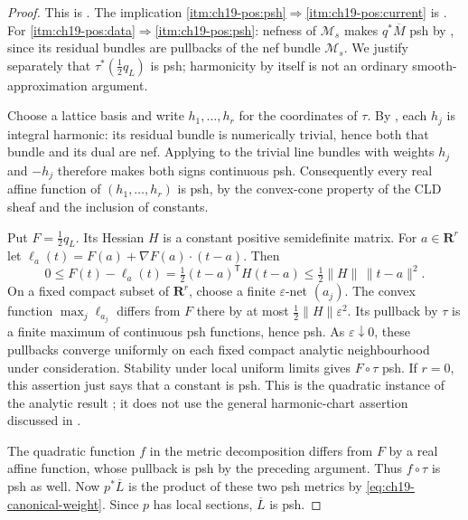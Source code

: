 \begin{proof}
This is \cite[Proposition~19.3.1, Corollary~19.3.2 and
Theorem~B.6.4]{CLD25}.  The implication
\cref{itm:ch19-pos:psh}$\Rightarrow$\cref{itm:ch19-pos:current} is
.  For
\cref{itm:ch19-pos:data}$\Rightarrow$\cref{itm:ch19-pos:psh}: nefness of
$\mathcal M_s$ makes $q^*\overline M$ psh by
, since its residual bundles are pullbacks
of the nef bundle $\mathcal M_s$.  We justify separately that
$\tau^*(\tfrac12q_L)$ is psh; harmonicity by itself is not an ordinary
smooth-approximation argument.

Choose a lattice basis and write $h_1,\ldots,h_r$ for the coordinates of
$\tau$.  By , each $h_j$ is integral harmonic:
its residual bundle is numerically trivial, hence both that bundle and its
dual are nef.  Applying  to the trivial
line bundles with weights $h_j$ and $-h_j$ therefore makes both signs
continuous psh.  Consequently every real affine
function of $(h_1,\ldots,h_r)$ is psh, by the convex-cone property of the
CLD sheaf and the inclusion of constants.

Put $F=\tfrac12q_L$.  Its Hessian $H$ is a constant positive semidefinite
matrix.  For $a\in\mathbf R^r$ let
$\ell_a(t)=F(a)+\nabla F(a)\cdot(t-a)$.  Then
\[
 0\leq F(t)-\ell_a(t)
       =\tfrac12(t-a)^{\mathsf T}H(t-a)
       \leq\tfrac12\|H\|\,\|t-a\|^2.
\]
On a fixed compact subset of $\mathbf R^r$, choose a finite
$\varepsilon$-net $(a_j)$.  The convex function $\max_j\ell_{a_j}$ differs
from $F$ there by at most $\tfrac12\|H\|\varepsilon^2$.  Its pullback by
$\tau$ is a finite maximum of continuous psh functions, hence psh.
As $\varepsilon\downarrow0$, these pullbacks converge uniformly on each
fixed compact analytic neighbourhood under consideration.  Stability under
local uniform limits gives $F\circ\tau$ psh.  If $r=0$, this assertion
just says that a constant is psh.  This is the quadratic instance of the
analytic result \cite[Corollary~18.8.9]{CLD25}; it does not use the
general harmonic-chart assertion discussed in
.

The quadratic function $f$ in the metric decomposition differs from $F$
by a real affine function, whose pullback is psh by the preceding
argument.  Thus $f\circ\tau$ is psh as well.  Now $p^*\overline L$ is the
product of these two psh metrics by
\eqref{eq:ch19-canonical-weight}.  Since $p$ has local sections,
$\overline L$ is psh.


\end{proof}
